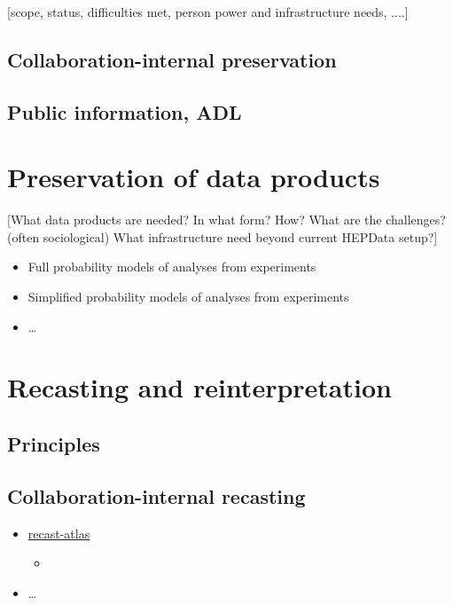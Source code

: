 \documentclass[11pt]{article}
\begin{document}
[scope, status, difficulties met, person power and infrastructure needs, ....]

\subsection{Collaboration-internal preservation}

\subsection{Public information, ADL}

\section{Preservation of data products}

[What data products are needed? In what form? How? 
What are the challenges? (often sociological) What infrastructure need beyond current HEPData setup?]

\begin{itemize}
    \item Full probability models of analyses from experiments
    \item Simplified probability models of analyses from experiments
    \item \ldots
\end{itemize}


\section{Recasting and reinterpretation}

\subsection{Principles}

\subsection{Collaboration-internal recasting}

\begin{itemize}
    \item \href{https://github.com/recast-hep/recast-atlas}{recast-atlas}
        \begin{itemize}
            \item {}
        \end{itemize}
    \item \ldots
\end{itemize}
\end{document}

